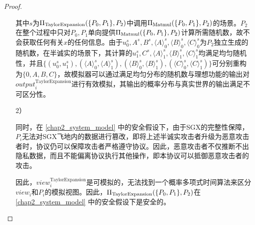 \begin{proof}
\begin{itemize}
		其中$s$为$\Pi_{\rm TaylorExpansion}(\{P_0, P_1\}, P_2)$中调用$\Pi_{\rm Matmul}(\{P_0, P_1\}, P_2)$的场景。$P_2$在整个过程中只对$P_0, P_1$单向提供$\Pi_{\rm Matmul}(\{P_0, P_1\}, P_2)$计算所需随机数，故不会获取任何有关$x$的任何信息。由于$u_0^s, A^s, B^s, \langle A\rangle_0^s,\langle B\rangle_0^s,\langle C\rangle_0^s$为$P_2$独立生成的随机数，在半诚实的场景下，其计算的$u_1^s, C^s, \langle A\rangle_1^s,\langle B\rangle_1^s,\langle C\rangle_1^s$均满足均匀随机性，并且$\{(u_0^s, u_1^s), (\langle A\rangle_0^s, \langle A\rangle_1^s), (\langle B\rangle_0^s, \langle B\rangle_1^s), (\langle C\rangle_0^s, \langle C\rangle_1^s)\}$可分别重构为$\{0, A, B, C\}$，故模拟器可以通过满足均匀分布的随机数与理想功能的输出对$output_i^{\text{TaylorExpansion}}$进行有效模拟，其输出的概率分布与真实世界的输出满足不可区分性。
		
		\item [2）]
		
		同时，在 \ref{chap2_system_model} 中的安全假设下，由于SGX的完整性保障\cite{SGX_Explained}，$P_i$无法对SGX飞地内的数据进行篡改，即将上述半诚实攻击者升级为恶意攻击者时，协议仍可以保障攻击者严格遵守协议。因此，恶意攻击者不仅推断不出隐私数据，而且不能偏离协议执行其他操作，即本协议可以抵御恶意攻击者的攻击。
		
		因此，$view_i^{\text{TaylorExpansion}}$是可模拟的，无法找到一个概率多项式时间算法来区分$view_i$和$P_i$的模拟视图。因此，$\Pi_{\rm TaylorExpansion}(\{P_0, P_1\}, P_2)$在 \ref{chap2_system_model} 中的安全假设下是安全的。
		
	\end{itemize}


\end{proof}
